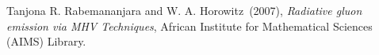 \begin{thebibliography}{999}

Tanjona R. Rabemananjara and W. A. Horowitz~(2007),  
{\it  Radiative gluon emission via MHV Techniques}, African Institute for Mathematical Sciences (AIMS) Library.

%
%
%

\end{thebibliography}




